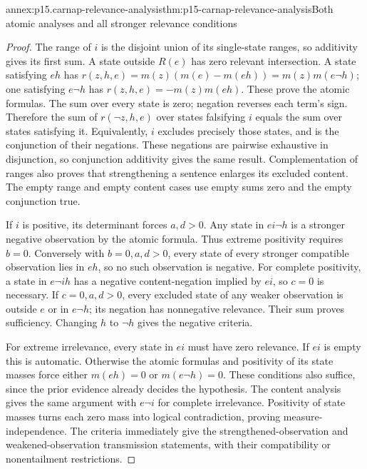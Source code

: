 \begin{annexitem}{annex:p15.carnap-relevance-analysis}{thm:p15-carnap-relevance-analysis}{Both atomic analyses and all stronger relevance conditions}
\begin{proof}
The range of \(i\) is the disjoint union of its single-state ranges,
so additivity gives its first sum. A state outside \(R(e)\) has
zero relevant intersection. A state satisfying \(eh\) has
\(r(z,h,e)=m(z)(m(e)-m(eh))=m(z)m(e\neg h)\);
one satisfying \(e\neg h\) has
\(r(z,h,e)=-m(z)m(eh)\). These prove the atomic formulas.
The sum over every state is zero; negation reverses each term's sign.
Therefore the sum of \(r(\neg z,h,e)\) over states falsifying
\(i\) equals the sum over states satisfying it. Equivalently,
\(i\) excludes precisely those states, and is the conjunction of
their negations. These negations are pairwise exhaustive in disjunction,
so conjunction additivity gives the same result. Complementation of
ranges also proves that strengthening a sentence enlarges its excluded
content. The empty range and empty content cases use empty sums zero
and the empty conjunction true.

If \(i\) is positive, its determinant forces \(a,d>0\).
Any state in \(ei\neg h\) is a stronger negative observation
by the atomic formula. Thus extreme positivity requires \(b=0\).
Conversely with \(b=0,a,d>0\), every state of every stronger
compatible observation lies in \(eh\), so no such observation
is negative. For complete positivity, a state in \(e\neg i h\)
has a negative content-negation implied by \(ei\), so \(c=0\)
is necessary. If \(c=0,a,d>0\), every excluded state of any
weaker observation is outside \(e\) or in \(e\neg h\);
its negation has nonnegative relevance. Their sum proves sufficiency.
Changing \(h\) to \(\neg h\) gives the negative criteria.

For extreme irrelevance, every state in \(ei\) must have zero
relevance. If \(ei\) is empty this is automatic. Otherwise the
atomic formulas and positivity of its state masses force either
\(m(eh)=0\) or \(m(e\neg h)=0\). These conditions also
suffice, since the prior evidence already decides the hypothesis.
The content analysis gives the same argument with \(e\neg i\)
for complete irrelevance. Positivity of state masses turns each zero
mass into logical contradiction, proving measure-independence.
The criteria immediately give the strengthened-observation and
weakened-observation transmission statements, with their compatibility
or nonentailment restrictions.


\end{proof}
\end{annexitem}
